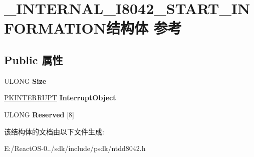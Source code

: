 \hypertarget{struct___i_n_t_e_r_n_a_l___i8042___s_t_a_r_t___i_n_f_o_r_m_a_t_i_o_n}{}\section{\+\_\+\+I\+N\+T\+E\+R\+N\+A\+L\+\_\+\+I8042\+\_\+\+S\+T\+A\+R\+T\+\_\+\+I\+N\+F\+O\+R\+M\+A\+T\+I\+O\+N结构体 参考}
\label{struct___i_n_t_e_r_n_a_l___i8042___s_t_a_r_t___i_n_f_o_r_m_a_t_i_o_n}
\subsection*{Public 属性}
\begin{DoxyCompactItemize}
\item 
\mbox{\label{struct___i_n_t_e_r_n_a_l___i8042___s_t_a_r_t___i_n_f_o_r_m_a_t_i_o_n_ab0624d32c5894c00366bdbe1a13bf60f}} 
U\+L\+O\+NG {\bfseries Size}
\item 
\mbox{\label{struct___i_n_t_e_r_n_a_l___i8042___s_t_a_r_t___i_n_f_o_r_m_a_t_i_o_n_a6a4bef1959e8702040d30b98ae277b81}} 
\hyperlink{struct___k_i_n_t_e_r_r_u_p_t}{P\+K\+I\+N\+T\+E\+R\+R\+U\+PT} {\bfseries Interrupt\+Object}
\item 
\mbox{\label{struct___i_n_t_e_r_n_a_l___i8042___s_t_a_r_t___i_n_f_o_r_m_a_t_i_o_n_aa3777334417c997fcf73adf9e287ac84}} 
U\+L\+O\+NG {\bfseries Reserved} \mbox{[}8\mbox{]}
\end{DoxyCompactItemize}


该结构体的文档由以下文件生成\+:\begin{DoxyCompactItemize}
\item 
E\+:/\+React\+O\+S-\/0../sdk/include/psdk/ntdd8042.\+h\end{DoxyCompactItemize}
